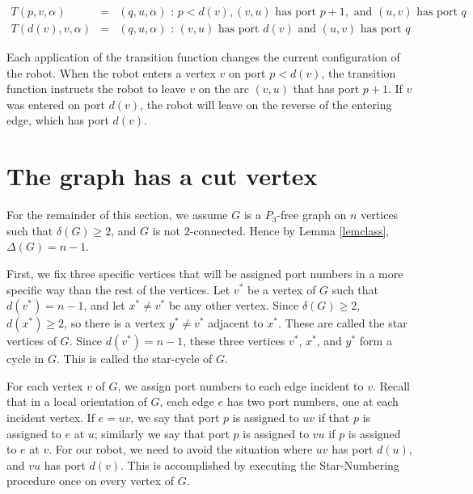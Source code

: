 \documentclass[12pt,letterpaper,oneside]{book}
\begin{document}
\begin{eqnarray*}
T(p,v,\alpha)    &=& (q,u,\alpha) \mbox{ : } p < d(v), (v,u) \mbox{ has port }p+1, \mbox{ and } (u,v) \mbox{ has port } q\\
T(d(v),v,\alpha) &=& (q,u,\alpha) \mbox{ : } (v,u) \mbox{ has port } d(v)\mbox{ and } (u,v) \mbox{ has port } q
\end{eqnarray*}

Each application of the transition function changes the current configuration of the robot.  
When the robot enters a vertex $v$ on port $p<d(v)$, the transition function instructs the robot to leave $v$ on the 
arc $(v,u)$ that has port $p+1$.  If $v$ was entered on port $d(v)$, the robot will leave on the reverse of the entering edge, 
which has port $d(v)$.  

\newpage
\section{The graph has a cut vertex}
\label{sec:cut}


For the remainder of this section, we assume $G$ is a $P_3$-free graph on $n$ vertices such that $\delta(G)\ge 2$, and $G$ is 
not $2$-connected.  
Hence by Lemma \ref{lemclass}, $\Delta(G)=n-1$.  

First, we fix three 
specific vertices that will be assigned port numbers in a more specific way than the rest of the vertices.  
Let $v^*$ be a vertex of $G$ such that $d(v^*)=n-1$, and let $x^*\ne v^*$ be any other vertex.  Since $\delta(G)\ge 2$, $d(x^*)\ge 2$, so there 
is a vertex $y^*\ne v^*$ adjacent to $x^*$.  These are called the star vertices of $G$.  Since $d(v^*)=n-1$, these three vertices $v^*$, $x^*$, and $y^*$ form a cycle in $G$.  This is called the star-cycle of $G$.  

For each vertex $v$ of $G$, 
we assign port numbers to each edge incident to $v$.  Recall that in a local orientation of $G$, each edge $e$ has two port numbers, one at 
each incident vertex.  If $e=uv$, we say that port $p$ is assigned to $uv$ if that $p$ is assigned to $e$ at $u$; 
similarly we say that port $p$ is assigned to $vu$ if $p$ is assigned to $e$ at $v$.  
For our robot, we need to avoid the situation where $uv$ has port $d(u)$, and $vu$ has port $d(v)$.  
This is accomplished by executing the Star-Numbering procedure once on 
every vertex of $G$.  
\end{document}
